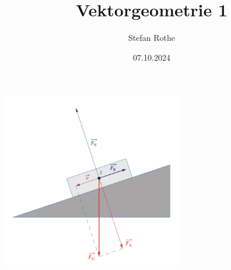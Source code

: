 \documentclass[parskip=half]{scrartcl}
\title{Vektorgeometrie 1}
\author{Stefan Rothe}
\date{07.10.2024}
\begin{document}
  \maketitle
  \thispagestyle{firstpage}
  \begin{center}
    \includegraphics[width=0.6\textwidth]{title.png}
  \end{center}
  \tableofcontents
  \newpage
  
  
  
  
  
\end{document}

